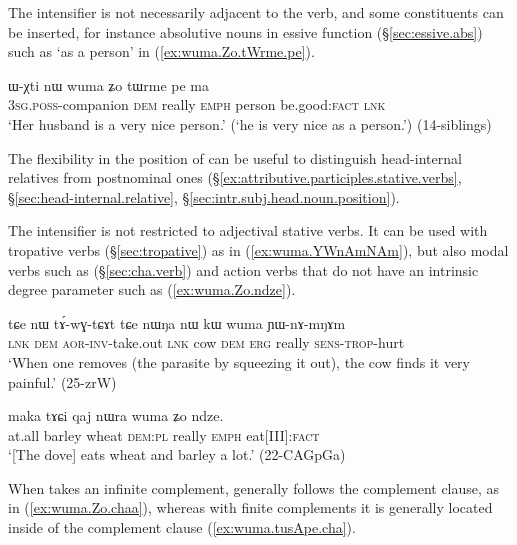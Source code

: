 The intensifier is not necessarily adjacent to the verb, and some constituents can be inserted, for instance absolutive nouns in essive function (§\ref{sec:essive.abs}) such as  `as a person' in (\ref{ex:wuma.Zo.tWrme.pe}).

\begin{exe}
\ex \label{ex:wuma.Zo.tWrme.pe}
\gll ɯ-χti nɯ wuma ʑo tɯrme pe ma \\
\textsc{3sg}.\textsc{poss}-companion \textsc{dem} really \textsc{emph} person be.good:\textsc{fact} \textsc{lnk} \\
\glt `Her husband is a very nice person.' (`he is very nice as a person.') (14-siblings)
\end{exe}

The flexibility in the position of  can be useful to distinguish head-internal relatives from postnominal ones (§\ref{ex:attributive.participles.stative.verbs}, §\ref{sec:head-internal.relative}, §\ref{sec:intr.subj.head.noun.position}).

The intensifier  is not restricted to adjectival stative verbs. It can be used with tropative verbs (§\ref{sec:tropative}) as in (\ref{ex:wuma.YWnAmNAm}), but also modal verbs such as  (§\ref{sec:cha.verb}) and action verbs that do not have an intrinsic degree parameter such as  (\ref{ex:wuma.Zo.ndze}).

\begin{exe}
\ex \label{ex:wuma.YWnAmNAm}
\gll  tɕe nɯ tɤ́-wɣ-tɕɤt tɕe nɯŋa nɯ kɯ wuma ɲɯ-nɤ-mŋɤm  \\
\textsc{lnk} \textsc{dem} \textsc{aor}-\textsc{inv}-take.out \textsc{lnk} cow \textsc{dem} \textsc{erg} really \textsc{sens}-\textsc{trop}-hurt  \\
\glt `When one removes (the parasite by squeezing it out), the cow finds it very painful.' (25-zrW)
\end{exe}

\begin{exe}
\ex \label{ex:wuma.Zo.ndze}
\gll  maka tɤɕi qaj nɯra wuma ʑo ndze. \\
at.all barley wheat \textsc{dem}:\textsc{pl} really \textsc{emph} eat[III]:\textsc{fact} \\
\glt `[The dove] eats wheat and barley a lot.' (22-CAGpGa)
\end{exe}

When  takes an infinite complement,  generally follows the complement clause, as in (\ref{ex:wuma.Zo.chaa}), whereas with finite complements it is generally located inside of the complement clause (\ref{ex:wuma.tusApe.cha}).

